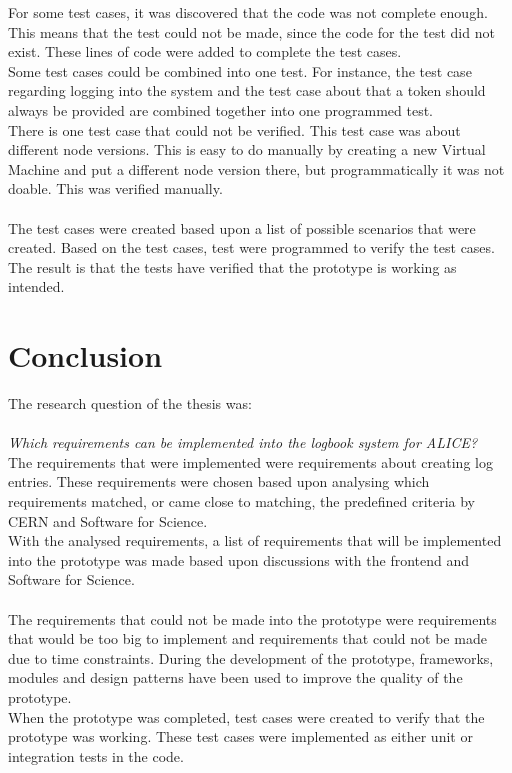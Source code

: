 \documentclass[paper=a4, fontsize=11pt,twoside]{scrartcl}	%
\begin{document}
For some test cases, it was discovered that the code was not complete enough. This means that the test could not be made, since the code for the test did not exist. These lines of code were added to complete the test cases. \\
Some test cases could be combined into one test. For instance, the test case regarding logging into the system and the test case about that a token should always be provided are combined together into one programmed test. \\
There is one test case that could not be verified. This test case was about different node versions. This is easy to do manually by creating a new Virtual Machine and put a different node version there, but programmatically it was not doable. This was verified manually. \\ \\

The test cases were created based upon a list of possible scenarios that were created. Based on the test cases, test were programmed to verify the test cases. The result is that the tests have verified that the prototype is working as intended. 

\newpage
\section{Conclusion}
The research question of the thesis was: \\ \\
\textit{Which requirements can be implemented into the logbook system for ALICE?} \\

The requirements that were implemented were requirements about creating log entries. These requirements were chosen based upon analysing which requirements matched, or came close to matching, the predefined criteria by CERN and Software for Science. \\
With the analysed requirements, a list of requirements that will be implemented into the prototype was made based upon discussions with the frontend and Software for Science. \\ \\ 
The requirements that could not be made into the prototype were requirements that would be too big to implement and requirements that could not be made due to time constraints. During the development of the prototype, frameworks, modules and design patterns have been used to improve the quality of the prototype. \\
When the prototype was completed, test cases were created to verify that the prototype was working. These test cases were implemented as either unit or integration tests in the code. 
\end{document}
